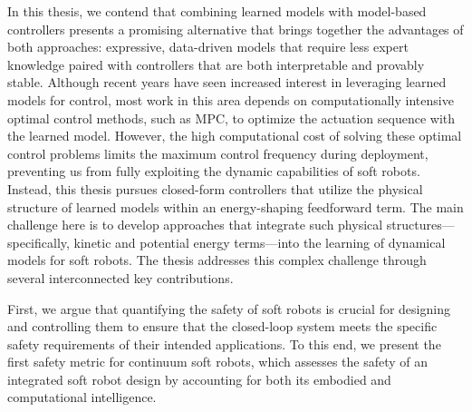 In this thesis, we contend that combining learned models with model-based controllers presents a promising alternative that brings together the advantages of both approaches: expressive, data-driven models that require less expert knowledge paired with controllers that are both interpretable and provably stable. Although recent years have seen increased interest in leveraging learned models for control, most work in this area depends on computationally intensive optimal control methods, such as \gls{MPC}, to optimize the actuation sequence with the learned model. However, the high computational cost of solving these optimal control problems limits the maximum control frequency during deployment, preventing us from fully exploiting the dynamic capabilities of soft robots. Instead, this thesis pursues closed-form controllers that utilize the physical structure of learned models within an energy-shaping feedforward term. The main challenge here is to develop approaches that integrate such physical structures—specifically, kinetic and potential energy terms—into the learning of dynamical models for soft robots.
The thesis addresses this complex challenge through several interconnected key contributions. 

First, we argue that quantifying the safety of soft robots is crucial for designing and controlling them to ensure that the closed-loop system meets the specific safety requirements of their intended applications. To this end, we present the first safety metric for continuum soft robots, which assesses the safety of an integrated soft robot design by accounting for both its embodied and computational intelligence.

